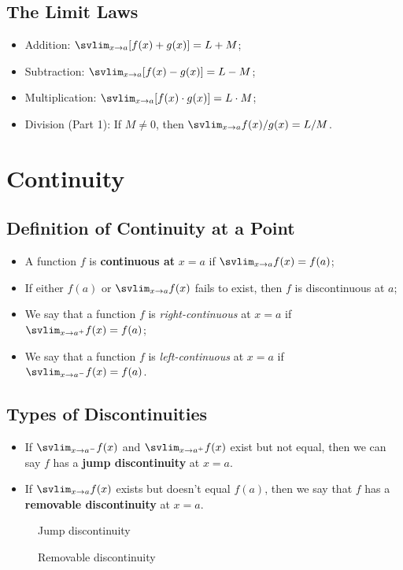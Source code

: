\subsection{The Limit Laws}
\begin{itemize}
\item Addition: $\svlim_{x\to a}[f(x)+g(x)]=L+M$;
\item Subtraction: $\svlim_{x\to a}[f(x)-g(x)]=L-M$;
\item Multiplication: $\svlim_{x\to a}[f(x)\cdot g(x)]=L\cdot M$;
\item Division (Part 1): If $M\neq 0$, then $\svlim_{x\to a}f(x)/g(x)=L/M$.
\end{itemize}


\section{Continuity}
\subsection{Definition of Continuity at a Point}
\begin{itemize}
\item A function $f$ is \textbf{continuous at} $x=a$ if $\svlim_{x\to a}f(x)=f(a)$;
\item If either $f(a)$ or $\svlim_{x\to a} f(x)$ fails to exist, then $f$ is discontinuous at $a$;
\item We say that a function $f$ is \textit{right-continuous} at $x=a$ if $\svlim_{x\to a^+}f(x)=f(a)$;
\item We say that a function $f$ is \textit{left-continuous} at $x=a$ if $\svlim_{x\to a^-}f(x)=f(a)$.
\end{itemize}

\subsection{Types of Discontinuities}
\begin{itemize}
  \item If $\svlim_{x\to a^-}f(x)$ and $\svlim_{x\to a^+}f(x)$ exist but not equal, then we can say $f$ has a \textbf{jump discontinuity} at $x=a$.
  \item If $\svlim_{x\to a}f(x)$ exists but doesn't equal $f(a)$, then we say that $f$ has a \textbf{removable discontinuity} at $x=a$.
\end{itemize}
\begin{figure}[H]\centering{}\caption{Jump discontinuity}\end{figure}
\begin{figure}[H]\centering{}\caption{Removable discontinuity}\end{figure}


